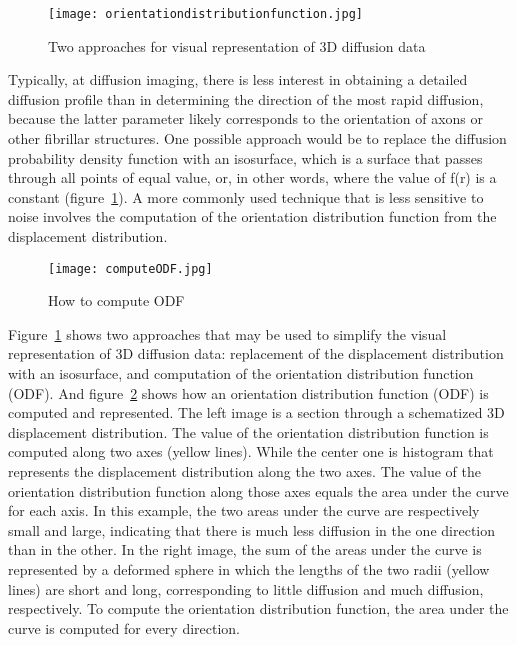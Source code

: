 \begin{figure} 
  \centering 
  \texttt{[image: orientationdistributionfunction.jpg]}
  \caption{Two approaches for visual representation of 3D diffusion data}
  \label{Fig:orientation_distribution_function}
\end{figure}
Typically, at diffusion imaging, there is less interest in obtaining a detailed diffusion profile than in determining the direction of the most rapid diffusion, because the latter parameter likely corresponds to the orientation of axons or other fibrillar structures. One possible approach would be to replace the diffusion probability density function with an isosurface, which is a surface that passes through all points of equal value, or, in other words, where the value of ƒ(r) is a constant (figure~\ref{Fig:orientation_distribution_function}). A more commonly used technique that is less sensitive to noise involves the computation of the orientation distribution function from the displacement distribution.

\begin{figure} 
  \centering 
  \texttt{[image: computeODF.jpg]}
  \caption{How to compute ODF}
  \label{Fig:compute_ODF}
\end{figure}

Figure~\ref{Fig:orientation_distribution_function} shows two approaches that may be used to simplify the visual representation of 3D diffusion data: replacement of the displacement distribution with an isosurface, and computation of the orientation distribution function (ODF). And figure~\ref{Fig:compute_ODF} shows how an orientation distribution function (ODF) is computed and represented. The left image is a section through a schematized 3D displacement distribution. The value of the orientation distribution function is computed along two axes (yellow lines). While the center one is histogram that represents the displacement distribution along the two axes. The value of the orientation distribution function along those axes equals the area under the curve for each axis. In this example, the two areas under the curve are respectively small and large, indicating that there is much less diffusion in the one direction than in the other. In the right image, the sum of the areas under the curve is represented by a deformed sphere in which the lengths of the two radii (yellow lines) are short and long, corresponding to little diffusion and much diffusion, respectively. To compute the orientation distribution function, the area under the curve is computed for every direction.

